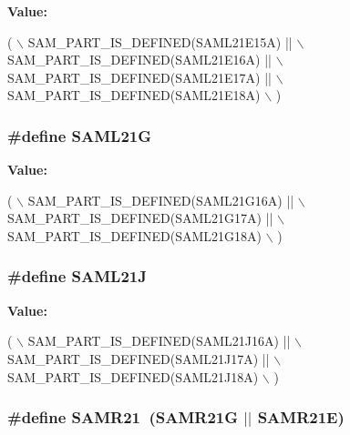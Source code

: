 {\bfseries Value\-:}
\begin{DoxyCode}
( \(\backslash\)
                SAM\_PART\_IS\_DEFINED(SAML21E15A) || \(\backslash\)
                SAM\_PART\_IS\_DEFINED(SAML21E16A) || \(\backslash\)
                SAM\_PART\_IS\_DEFINED(SAML21E17A) || \(\backslash\)
                SAM\_PART\_IS\_DEFINED(SAML21E18A) \(\backslash\)
        )
\end{DoxyCode}
\hypertarget{group__sam__part__macros__group_ga81494be96e002472b9a552c8cf261db0}{
\subsubsection[{S\-A\-M\-L21\-G}]{\setlength{\rightskip}{0pt plus 5cm}\#define S\-A\-M\-L21\-G}}\label{group__sam__part__macros__group_ga81494be96e002472b9a552c8cf261db0}
{\bfseries Value\-:}
\begin{DoxyCode}
( \(\backslash\)
                SAM\_PART\_IS\_DEFINED(SAML21G16A) || \(\backslash\)
                SAM\_PART\_IS\_DEFINED(SAML21G17A) || \(\backslash\)
                SAM\_PART\_IS\_DEFINED(SAML21G18A) \(\backslash\)
        )
\end{DoxyCode}
\hypertarget{group__sam__part__macros__group_gab33eded948f0cd289b45cf2570ace7e1}{
\subsubsection[{S\-A\-M\-L21\-J}]{\setlength{\rightskip}{0pt plus 5cm}\#define S\-A\-M\-L21\-J}}\label{group__sam__part__macros__group_gab33eded948f0cd289b45cf2570ace7e1}
{\bfseries Value\-:}
\begin{DoxyCode}
( \(\backslash\)
                SAM\_PART\_IS\_DEFINED(SAML21J16A) || \(\backslash\)
                SAM\_PART\_IS\_DEFINED(SAML21J17A) || \(\backslash\)
                SAM\_PART\_IS\_DEFINED(SAML21J18A) \(\backslash\)
        )
\end{DoxyCode}
\hypertarget{group__sam__part__macros__group_ga63b66a40b044f5f10d6dfa3ff51a0acb}{
\subsubsection[{S\-A\-M\-R21}]{\setlength{\rightskip}{0pt plus 5cm}\#define S\-A\-M\-R21~(S\-A\-M\-R21\-G $|$$|$ S\-A\-M\-R21\-E)}}\label{group__sam__part__macros__group_ga63b66a40b044f5f10d6dfa3ff51a0acb}
